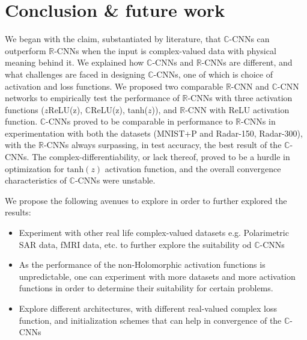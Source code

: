 \chapter{Conclusion \& future work} \label{chap:experiments}
We began with the claim, substantiated by literature, that $\mathbb{C}$-CNNs can outperform $\mathbb{R}$-CNNs when the input is complex-valued data with physical meaning behind it. We explained how $\mathbb{C}$-CNNs and $\mathbb{R}$-CNNs are different, and what challenges are faced in designing $\mathbb{C}$-CNNs, one of which is choice of activation and loss functions. We proposed two comparable $\mathbb{R}$-CNN and $\mathbb{C}$-CNN networks to empirically test the performance of $\mathbb{R}$-CNNs with three activation functions ($z$ReLU(z), $\mathbb{C}$ReLU(z), tanh($z$)), and $\mathbb{R}$-CNN with ReLU activation function. $\mathbb{C}$-CNNs proved to be comparable in performance to $\mathbb{R}$-CNNs in experimentation with both the datasets (MNIST+P and Radar-150, Radar-300), with the $\mathbb{R}$-CNNs always surpassing, in test accuracy, the best result of the $\mathbb{C}$-CNNs. The complex-differentiability, or lack thereof, proved to be a hurdle in optimization for $\mathrm{tanh}(z)$ activation function, and the overall convergence characteristics of $\mathbb{C}$-CNNs were unstable. 

We propose the following avenues to explore in order to further explored the results:
\begin{itemize}
	\item Experiment with other real life complex-valued datasets e.g.  Polarimetric SAR data, fMRI data, etc. to further explore the suitability od $\mathbb{C}$-CNNs
	\item As the performance of the non-Holomorphic activation functions is unpredictable, one can experiment with more datasets and more activation functions in order to determine their suitability for certain problems.
	\item Explore different architectures, with different real-valued complex loss function, and initialization schemes that can help in convergence of the $\mathbb{C}$-CNNs
	 
\end{itemize} 